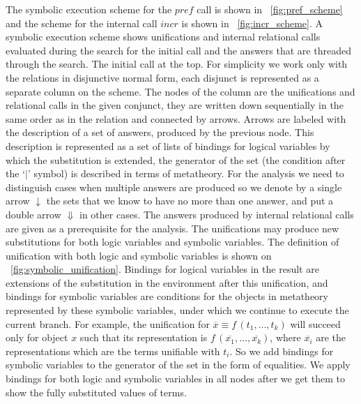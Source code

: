 The symbolic execution scheme for the $pref$ call is shown in \figureword~\ref{fig:pref_scheme} and the scheme for the internal call $incr$ is shown in \figureword~\ref{fig:incr_scheme}. A symbolic execution scheme shows unifications and internal relational calls evaluated during the search for the initial call and the answers that are threaded through the search. The initial call at the top.
For simplicity we work only with the relations in disjunctive normal form, each disjunct is represented as a separate column on the scheme. The nodes of the column are
the unifications and relational calls in the given conjunct, they are written down sequentially in the same order as in the relation and connected by arrows. Arrows are
labeled with the description of a set of answers, produced by the previous node. This description is represented as a set of lists of bindings for logical variables by which the
substitution is extended, the generator of the set (the condition after the `$\mid$' symbol) is described in terms of metatheory. For the analysis we need to distinguish
cases when multiple answers are produced so we denote by a single arrow $\downarrow$ the sets that we know to have no more than one answer, and put a double arrow $\Downarrow$
in other cases. The answers produced by internal relational calls are given as a prerequisite for the analysis. The unifications may produce new substitutions for
both logic variables and symbolic variables. The definition of unification with both logic and symbolic variables is shown on \figureword~\ref{fig:symbolic_unification}.
Bindings for logical variables in the result are extensions of the substitution in the environment after this unification, and bindings for symbolic variables are conditions
for the objects in metatheory represented by these symbolic variables, under which we continue to execute the current branch. For example, the unification for $\overline{x} \equiv f\,(t_1, \dots, t_k)$ will succeed only for object $x$ such that its representation is $f\,(\overline{x_1}, \dots, \overline{x_k})$, where $\overline{x_i}$ are the representations which are the terms
unifiable with $t_i$. So we add bindings for symbolic variables to the generator of the set in the form of equalities. We apply bindings for both logic and symbolic variables in
all nodes after we get them to show the fully substituted values of terms.


